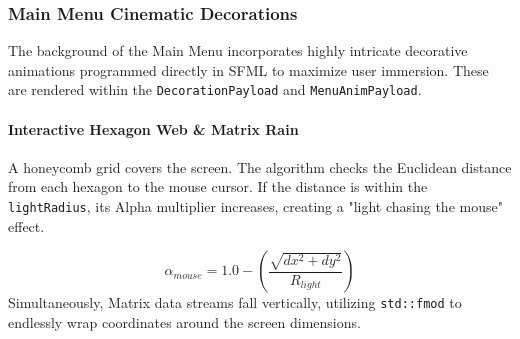 \subsubsection{Main Menu Cinematic Decorations} 
The background of the Main Menu incorporates highly intricate decorative animations programmed directly in SFML to maximize user immersion. These are rendered within the \texttt{DecorationPayload} and \texttt{MenuAnimPayload}.

\paragraph{Interactive Hexagon Web \& Matrix Rain} 
A honeycomb grid covers the screen. The algorithm checks the Euclidean distance from each hexagon to the mouse cursor. If the distance is within the \texttt{lightRadius}, its Alpha multiplier increases, creating a "light chasing the mouse" effect.

\begin{equation} 
    \alpha_{mouse} = 1.0 - \left( \frac{\sqrt{dx^2 + dy^2}}{R_{light}} \right) 
\end{equation} 
Simultaneously, Matrix data streams fall vertically, utilizing \texttt{std::fmod} to endlessly wrap coordinates around the screen dimensions.

